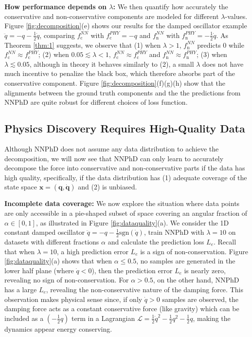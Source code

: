 \documentclass[aps,pre,reprint,superscriptaddress,nofootinbib,amsmath,amssymb]{revtex4-2}
\newcommand{\mat}[1]{\mathbf{#1}}
\newcommand{\x}{\mat{x}}
\newcommand{\q}{\mat{q}}
\newcommand{\qd}{\dot{\mat{q}}}
\newcommand{\lag}{\mathcal{L}}
\begin{document}
{\bf How performance depends on $\lambda$:} 
We then quantify how accurately the 
conservative and non-conservative components are modeled for different $\lambda$-values. 
Figure \ref{fig:decomposition}(e) shows our results for
the damped oscillator example $\ddot{q}=-q-\frac{1}{2}\dot{q}$, comparing $f_{\mathrm{c}}^{NN}$ with $f_{\mathrm{c}}^{PHY}=-q$ and $f_{\mathrm{n}}^{NN}$ with $f_{\mathrm{n}}^{PHY}=-\frac{1}{2}\dot{q}$. As Theorem \ref{thm:1} suggests, we observe that (1) when $\lambda>1$, $f^{NN}_{\mathrm{n}}$ predicts $0$ while $f^{NN}_{\mathrm{c}}\approx f_{\mathrm{c}}^{PHY}$; (2) when $0.05\lesssim\lambda<1$, $f^{NN}_{\mathrm{c}}\approx f^{PHY}_{\mathrm{c}}$ and $f^{NN}_{\mathrm{n}}\approx f^{PHY}_{\mathrm{n}}$; (3) when $\lambda\lesssim 0.05$, although in theory it behaves similarly to (2), a small $\lambda$ does not have much incentive to penalize the  black box, which therefore absorbs part of the conservative component. Figure \ref{fig:decomposition}(f)(g)(h) show that the alignments between the ground truth components and the the predictions from NNPhD are quite robust for different choices of loss function.


\subsection{Physics Discovery Requires High-Quality Data}\label{sec:data_quality_exp}

Although NNPhD does not assume any data distribution to achieve the decomposition, we will now see that NNPhD can only learn to accurately decompose the force into conservative and non-conservative parts if the 
data has high quality, specifically, if the data distribution has 
(1) adequate coverage of the state space $\x=(\q,\qd)$ and (2) is unbiased. 


{\bf Incomplete data coverage:}
We now explore the situation where data points are only accessible in a pie-shaped subset of space covering an angular fraction of $\alpha\in [0,1]$, as illustrated in Figure \ref{fig:dataquality}(a). We consider the 1D constant damped oscillator $\ddot{q}=-q-\frac{1}{2}\mathrm{sgn}(\dot{q})$, train NNPhD with $\lambda=10$ on datasets with different fractions $\alpha$ and calculate the prediction loss $L_e$. Recall that when $\lambda=10$, a high prediction error $L_e$ is a sign of non-conservation. Figure \ref{fig:dataquality}(a) shows that when $\alpha\leq 0.5$, no samples are generated in the lower half plane (where $\dot{q}<0$), then the prediction error $L_e$ is nearly zero, revealing no sign of non-conservation. For $\alpha>0.5$, on the other hand, NNPhD has a large $L_e$, revealing the non-conservative nature of the damping force. This observation makes physical sense since, if only $\dot{q}>0$ samples are observed, the damping force acts as a constant conservative force (like gravity) which can be included as a $(-\frac{1}{2} q)$ term in a Lagrangian $\lag=\frac{1}{2}\dot{q}^2-\frac{1}{2}q^2-\frac{1}{2} q$, making the dynamics appear energy conserving.
\end{document}
